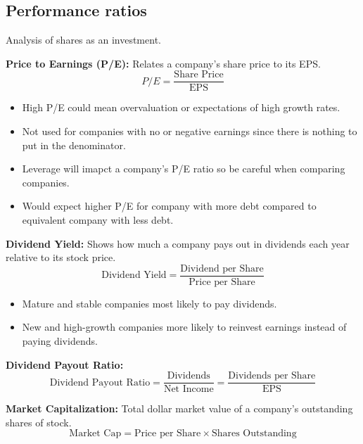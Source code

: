 \subsection{Performance ratios}
\begin{definition} Analysis of shares as an investment.

    \textbf{Price to Earnings (P/E):} Relates a company's share price to its EPS.
    \begin{equation}
        P/E = \frac{\text{Share Price}}{\text{EPS}}
    \end{equation}
    \begin{itemize}
        \item High P/E could mean overvaluation or expectations of high growth rates.
        \item Not used for companies with no or negative earnings since there is nothing to put in the denominator.
        \item Leverage will imapct a company's P/E ratio so be careful when comparing companies.
        \item Would expect higher P/E for company with more debt compared to equivalent company with less debt.
    \end{itemize}
    \vspace{1em}
    
    \textbf{Dividend Yield:} Shows how much a company pays out in dividends each year relative to its stock price.
    \begin{equation}
        \text{Dividend Yield} = \frac{\text{Dividend per Share}}{\text{Price per Share}}
    \end{equation}
    \begin{itemize}
        \item Mature and stable companies most likely to pay dividends.
        \item New and high-growth companies more likely to reinvest earnings instead of paying dividends.
    \end{itemize}
    \vspace{1em}
    
    \textbf{Dividend Payout Ratio:}
    \begin{equation}
        \text{Dividend Payout Ratio} = \frac{\text{Dividends}}{\text{Net Income}} = \frac{\text{Dividends per Share}}{\text{EPS}}
    \end{equation}
    \vspace{1em}
    
    \textbf{Market Capitalization:} Total dollar market value of a company's outstanding shares of stock.
    \begin{equation}
        \text{Market Cap} = \text{Price per Share} \times \text{Shares Outstanding}
    \end{equation}
\end{definition}